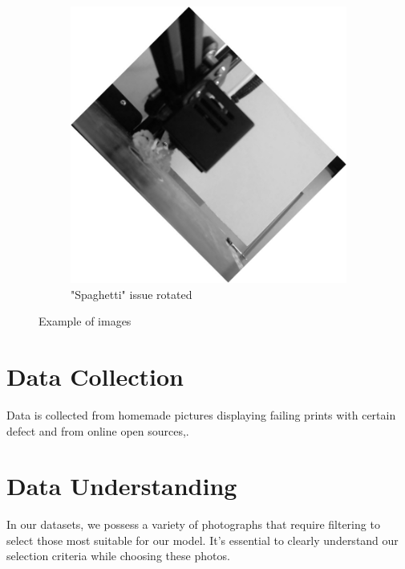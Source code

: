 \documentclass[12pt,a4paper]{article}
\begin{document}
\begin{figure}[h]
\begin{subfigure}[b]{0.45\textwidth}
        \includegraphics[width=\textwidth]{leg_broken_11.jpg}
        \caption{"Spaghetti" issue rotated\cite{onlineOpenSource1}}
        \label{fig:imageExampleRotated}
    \end{subfigure}
    \hfill

    \caption{Example of images}
    \label{fig:test}
\end{figure}


\newpage

\section{Data Collection}
Data is collected from homemade pictures displaying failing prints with certain defect and from online open sources\cite{onlineOpenSource1},\cite{onlineOpenSource2}.

\section{Data Understanding}
In our datasets, we possess a variety of photographs that require filtering to select those most suitable for our model. It's essential to clearly understand our selection criteria while choosing these photos.
\end{document}
